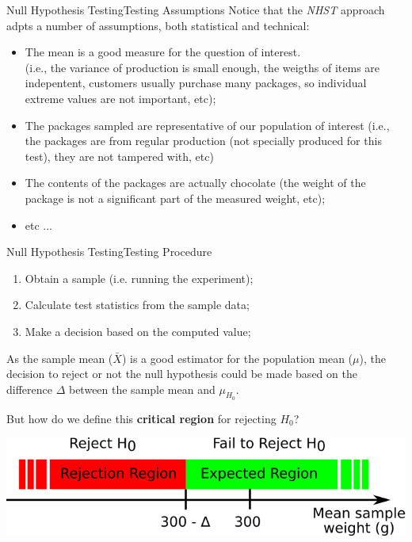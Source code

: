 \begin{frame}{Null Hypothesis Testing}{Testing Assumptions}
  Notice that the \emph{NHST} approach adpts a number of assumptions, both statistical and technical:\bigskip

  \begin{itemize}
    \item The mean is a good measure for the question of interest.\\
    (i.e., the variance of production is small enough, the weigths of items are indepentent, customers usually purchase many packages, so individual extreme values are not important, etc);\bigskip

    \item The packages sampled are representative of our population of interest (i.e., the packages are from regular production (not specially produced for this test), they are not tampered with, etc)\bigskip

    \item The contents of the packages are actually chocolate (the weight of the package is not a significant part of the measured weight, etc);\bigskip

    \item etc ...
  \end{itemize}
\end{frame}

\begin{frame}{Null Hypothesis Testing}{Testing Procedure}
  \begin{enumerate}
    \item Obtain a sample (i.e. running the experiment);
    \item Calculate test statistics from the sample data;
    \item Make a decision based on the computed value;
  \end{enumerate}\medskip

  As the sample mean ($\bar{X}$) is a good estimator for the population mean ($\mu$), the decision to reject or not the null hypothesis could be made based on the difference $\Delta$ between the sample mean and $\mu_{H_0}$.\medskip

  But how do we define this {\bf critical region} for rejecting $H_0$?

  \begin{center}
    \includegraphics[width=.8\textwidth]{../img/critical_region}
  \end{center}

\end{frame}



